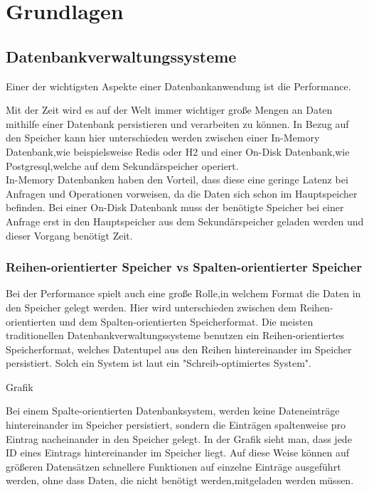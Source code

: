 \chapter{Grundlagen}

\section{Datenbankverwaltungssysteme}

Einer der wichtigsten Aspekte einer Datenbankanwendung ist die Performance. 

Mit der Zeit wird es auf der Welt immer wichtiger große Mengen an Daten mithilfe einer Datenbank persistieren und verarbeiten zu können.
In Bezug auf den Speicher kann hier unterschieden werden zwischen einer In-Memory Datenbank,wie beispielsweise Redis oder H2 und einer On-Disk Datenbank,wie Postgresql,welche auf dem Sekundärspeicher operiert. \\

In-Memory Datenbanken haben den Vorteil, dass diese eine geringe Latenz bei Anfragen und Operationen vorweisen, da die Daten sich schon im Hauptspeicher befinden. Bei einer On-Disk Datenbank muss der benötigte Speicher bei einer Anfrage erst in den Hauptspeicher aus dem Sekundärspeicher geladen werden und dieser Vorgang benötigt Zeit.\cite{KABAKUS2017520}


\subsection{Reihen-orientierter Speicher vs Spalten-orientierter Speicher}
Bei der Performance spielt auch eine große Rolle,in welchem Format die Daten in den Speicher gelegt werden. Hier wird unterschieden zwischen dem Reihen-orientierten und dem Spalten-orientierten Speicherformat.
Die meisten traditionellen Datenbankverwaltungssysteme benutzen ein Reihen-orientiertes Speicherformat, welches Datentupel aus den Reihen hintereinander im Speicher persistiert. Solch ein System ist laut \cite{Stonebraker2005CStoreAC} ein "Schreib-optimiertes System".

Grafik

Bei einem Spalte-orientierten Datenbanksystem, werden keine Dateneinträge hintereinander im Speicher persistiert, sondern die Einträgen spaltenweise pro Eintrag nacheinander in den Speicher gelegt. In der Grafik sieht man, dass jede ID eines Eintrags hintereinander im Speicher liegt. Auf diese Weise können auf größeren Datensätzen schnellere Funktionen auf einzelne Einträge ausgeführt werden, ohne dass Daten, die nicht benötigt werden,mitgeladen werden müssen.

